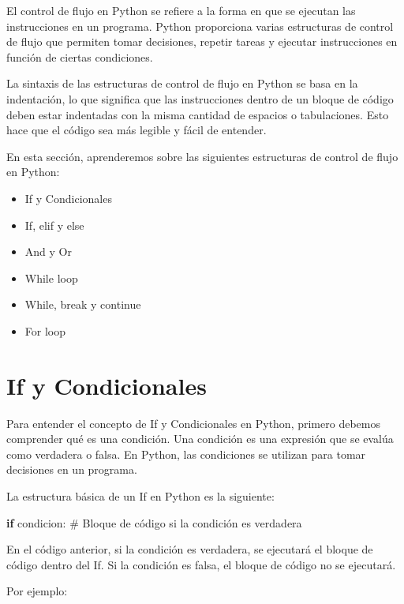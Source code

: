 \documentclass[
  a4paper,
  DIV=11,
  numbers=noendperiod,
  onepage,
  openany]{scrreprt}
\newenvironment{Shaded}{\begin{snugshade}}{\end{snugshade}}
\newcommand{\CommentTok}[1]{\textcolor[rgb]{0.37,0.37,0.37}{#1}}
\newcommand{\ControlFlowTok}[1]{\textcolor[rgb]{0.00,0.23,0.31}{\textbf{#1}}}
\newcommand{\NormalTok}[1]{\textcolor[rgb]{0.00,0.23,0.31}{#1}}
\providecommand{\tightlist}{%
  \setlength{\itemsep}{0pt}\setlength{\parskip}{0pt}}\usepackage{longtable,booktabs,array}
\begin{document}
El control de flujo en Python se refiere a la forma en que se ejecutan
las instrucciones en un programa. Python proporciona varias estructuras
de control de flujo que permiten tomar decisiones, repetir tareas y
ejecutar instrucciones en función de ciertas condiciones.

La sintaxis de las estructuras de control de flujo en Python se basa en
la indentación, lo que significa que las instrucciones dentro de un
bloque de código deben estar indentadas con la misma cantidad de
espacios o tabulaciones. Esto hace que el código sea más legible y fácil
de entender.

En esta sección, aprenderemos sobre las siguientes estructuras de
control de flujo en Python:

\begin{itemize}
\tightlist
\item
  If y Condicionales
\item
  If, elif y else
\item
  And y Or
\item
  While loop
\item
  While, break y continue
\item
  For loop
\end{itemize}

\section{If y Condicionales}\label{if-y-condicionales}

Para entender el concepto de If y Condicionales en Python, primero
debemos comprender qué es una condición. Una condición es una expresión
que se evalúa como verdadera o falsa. En Python, las condiciones se
utilizan para tomar decisiones en un programa.

La estructura básica de un If en Python es la siguiente:

\begin{Shaded}
\begin{Highlighting}[]
\ControlFlowTok{if}\NormalTok{ condicion:}
    \CommentTok{\# Bloque de código si la condición es verdadera}
\end{Highlighting}
\end{Shaded}

En el código anterior, si la condición es verdadera, se ejecutará el
bloque de código dentro del If. Si la condición es falsa, el bloque de
código no se ejecutará.

Por ejemplo:
\end{document}
